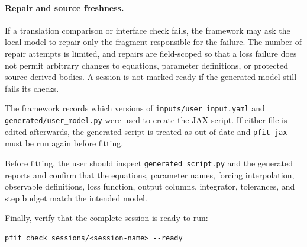 \paragraph{Repair and source freshness.}
If a translation comparison or interface check fails, the framework may ask the
local model to repair only the fragment responsible for the failure. The number
of repair attempts is limited, and repairs are field-scoped so that a loss
failure does not permit arbitrary changes to equations, parameter definitions,
or protected source-derived bodies. A session is not marked ready if the
generated model still fails its checks.

The framework records which versions of \texttt{inputs/user\_input.yaml} and
\texttt{generated/user\_model.py} were used to create the JAX script. If either
file is edited afterwards, the generated script is treated as out of date and
\texttt{pfit jax} must be run again before fitting.

Before fitting, the user should inspect \texttt{generated\_script.py} and the
generated reports and confirm that the equations, parameter names, forcing
interpolation, observable definitions, loss function, output columns, integrator,
tolerances, and step budget match the intended model.

Finally, verify that the complete session is ready to run:

\begin{verbatim}
pfit check sessions/<session-name> --ready
\end{verbatim}
